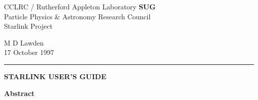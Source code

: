 \documentclass[twoside]{article}
\newcommand{\stardocauthors}   {M D Lawden}
\newcommand{\stardocdate}      {17 October 1997}
\newenvironment{latexonly}{}{}
\begin{document}
\thispagestyle{empty}

\begin{latexonly}
   {\small CCLRC / {\sc Rutherford Appleton Laboratory} \hfill {\bf SUG}}\\
   {Particle Physics \& Astronomy Research Council}\\
   {Starlink Project\\}
   \begin{flushright}
   \stardocauthors\\
   \stardocdate
   \end{flushright}
   \vspace{-4mm}
   \rule{\textwidth}{0.5mm}
   \vspace{5mm}
   \begin{center}
   {\LARGE\bf  STARLINK USER'S GUIDE}
   \end{center}
   \vspace{5mm}

   \vspace{10mm}
   \begin{center}
      {\Large\bf Abstract}
   \end{center}
\end{latexonly}
\end{document}
